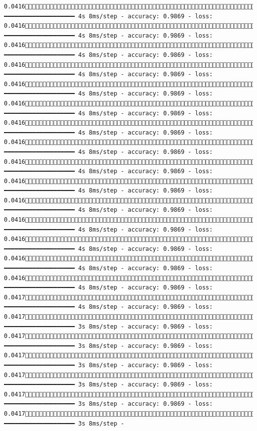 \documentclass[
  letterpaper,
  DIV=11,
  numbers=noendperiod]{scrreprt}
\begin{document}
\begin{verbatim}
0.04161232/1875 ━━━━━━━━━━━━━━━━━━━━ 4s 8ms/step - accuracy: 0.9869 - loss: 0.04161239/1875 ━━━━━━━━━━━━━━━━━━━━ 4s 8ms/step - accuracy: 0.9869 - loss: 0.04161247/1875 ━━━━━━━━━━━━━━━━━━━━ 4s 8ms/step - accuracy: 0.9869 - loss: 0.04161254/1875 ━━━━━━━━━━━━━━━━━━━━ 4s 8ms/step - accuracy: 0.9869 - loss: 0.04161261/1875 ━━━━━━━━━━━━━━━━━━━━ 4s 8ms/step - accuracy: 0.9869 - loss: 0.04161268/1875 ━━━━━━━━━━━━━━━━━━━━ 4s 8ms/step - accuracy: 0.9869 - loss: 0.04161275/1875 ━━━━━━━━━━━━━━━━━━━━ 4s 8ms/step - accuracy: 0.9869 - loss: 0.04161283/1875 ━━━━━━━━━━━━━━━━━━━━ 4s 8ms/step - accuracy: 0.9869 - loss: 0.04161290/1875 ━━━━━━━━━━━━━━━━━━━━ 4s 8ms/step - accuracy: 0.9869 - loss: 0.04161297/1875 ━━━━━━━━━━━━━━━━━━━━ 4s 8ms/step - accuracy: 0.9869 - loss: 0.04161304/1875 ━━━━━━━━━━━━━━━━━━━━ 4s 8ms/step - accuracy: 0.9869 - loss: 0.04161311/1875 ━━━━━━━━━━━━━━━━━━━━ 4s 8ms/step - accuracy: 0.9869 - loss: 0.04161318/1875 ━━━━━━━━━━━━━━━━━━━━ 4s 8ms/step - accuracy: 0.9869 - loss: 0.04161325/1875 ━━━━━━━━━━━━━━━━━━━━ 4s 8ms/step - accuracy: 0.9869 - loss: 0.04161332/1875 ━━━━━━━━━━━━━━━━━━━━ 4s 8ms/step - accuracy: 0.9869 - loss: 0.04171340/1875 ━━━━━━━━━━━━━━━━━━━━ 4s 8ms/step - accuracy: 0.9869 - loss: 0.04171347/1875 ━━━━━━━━━━━━━━━━━━━━ 3s 8ms/step - accuracy: 0.9869 - loss: 0.04171354/1875 ━━━━━━━━━━━━━━━━━━━━ 3s 8ms/step - accuracy: 0.9869 - loss: 0.04171361/1875 ━━━━━━━━━━━━━━━━━━━━ 3s 8ms/step - accuracy: 0.9869 - loss: 0.04171368/1875 ━━━━━━━━━━━━━━━━━━━━ 3s 8ms/step - accuracy: 0.9869 - loss: 0.04171375/1875 ━━━━━━━━━━━━━━━━━━━━ 3s 8ms/step - accuracy: 0.9869 - loss: 0.04171382/1875 ━━━━━━━━━━━━━━━━━━━━ 3s 8ms/step - 
\end{verbatim}
\end{document}
